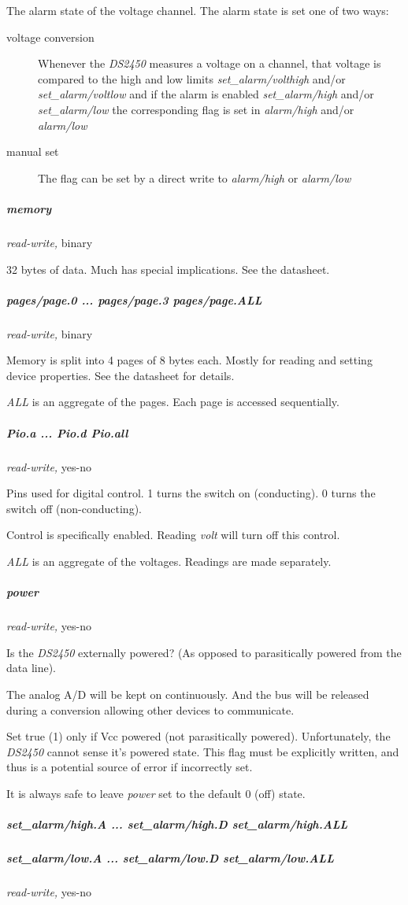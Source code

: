 The alarm state of the voltage channel. The alarm state is set one of two
ways: \begin{description}
\item [voltage conversion ] Whenever the \textit{DS2450} measures a voltage on a channel,
that voltage is compared to the high and low limits \textit{set\_alarm/volthigh}
and/or \textit{set\_alarm/voltlow} and if the alarm is enabled \textit{set\_alarm/high} and/or
\textit{set\_alarm/low} the corresponding flag is set in \textit{alarm/high} and/or \textit{alarm/low}

\item [manual set ] The flag can be set by a direct write to \textit{alarm/high} or \textit{alarm/low}

\end{description}

\subparagraph*{memory}\textit{read-write,} binary 

32 bytes of data. Much has special implications. See the datasheet. 
\subparagraph*{pages/page.0
... pages/page.3 pages/page.ALL}\textit{read-write,} binary 

Memory is split into 4 pages of 8 bytes each. Mostly for reading and setting
device properties. See the datasheet for details. 

\textit{ALL} is an aggregate of the pages. Each page is accessed sequentially. 
\subparagraph*{Pio.a
... Pio.d Pio.all}\textit{read-write,} yes-no 

Pins used for digital control. 1 turns the switch on (conducting). 0 turns
the switch off (non-conducting). 

Control is specifically enabled. Reading \textit{volt} will turn off this control.


\textit{ALL} is an aggregate of the voltages. Readings are made separately. 
\subparagraph*{power}\textit{read-write,}
yes-no 

Is the \textit{DS2450} externally powered? (As opposed to parasitically powered
from the data line). 

The analog A/D  will be kept on continuously. And the bus will be released
during a conversion allowing other devices to communicate. 

Set \textsf{true (1)} only if Vcc powered (not parasitically powered). Unfortunately,
the \textit{DS2450} cannot sense it's powered state. This flag must be explicitly
written, and thus is a potential source of error if incorrectly set. 

It is always safe to leave \textit{power} set to the default 0 (off) state. 
\subparagraph*{set\_alarm/high.A
... set\_alarm/high.D set\_alarm/high.ALL}
\subparagraph*{set\_alarm/low.A ... set\_alarm/low.D set\_alarm/low.ALL}\textit{read-write,}
yes-no 

